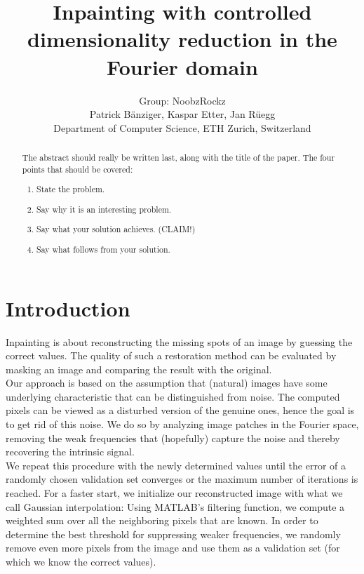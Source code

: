 \documentclass[10pt,conference,compsocconf]{IEEEtran}
\begin{document}
\title{Inpainting with controlled dimensionality reduction in the Fourier domain}

\author{
  Group: NoobzRockz\\
  Patrick Bänziger, Kaspar Etter, Jan Rüegg\\
  Department of Computer Science, ETH Zurich, Switzerland
}

\maketitle

\begin{abstract}
The abstract should really be written last, along with the title of
the paper. The four points that should be covered:
\begin{enumerate}
\item State the problem.
\item Say why it is an interesting problem.
\item Say what your solution achieves. (CLAIM!)
\item Say what follows from your solution.
\end{enumerate}
\end{abstract}

\section{Introduction}
Inpainting is about reconstructing the missing spots of an image by guessing the correct values. The quality of such a restoration method can be evaluated by masking an image and comparing the result with the original.\\
Our approach is based on the assumption that (natural) images have some underlying characteristic that can be distinguished from noise. The computed pixels can be viewed as a disturbed version of the genuine ones, hence the goal is to get rid of this noise. We do so by analyzing image patches in the Fourier space, removing the weak frequencies that (hopefully) capture the noise and thereby recovering the intrinsic signal.\\
We repeat this procedure with the newly determined values until the error of a randomly chosen validation set converges or the maximum number of iterations is reached. For a faster start, we initialize our reconstructed image with what we call Gaussian interpolation: Using MATLAB's filtering function, we compute a weighted sum over all the neighboring pixels that are known. In order to determine the best threshold for suppressing weaker frequencies, we randomly remove even more pixels from the image and use them as a validation set (for which we know the correct values).
\end{document}
